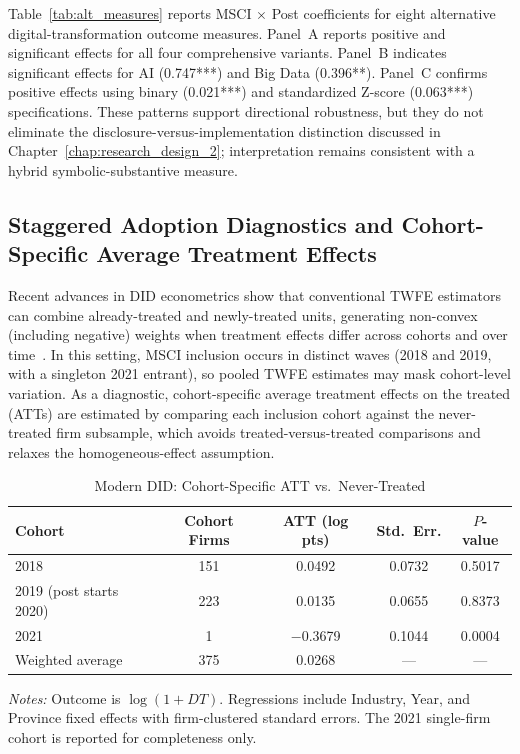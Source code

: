 Table~\ref{tab:alt_measures} reports MSCI $\times$ Post coefficients for eight alternative digital-transformation outcome measures. Panel~A reports positive and significant effects for all four comprehensive variants. Panel~B indicates significant effects for AI (0.747***) and Big Data (0.396**). Panel~C confirms positive effects using binary (0.021***) and standardized Z-score (0.063***) specifications. These patterns support directional robustness, but they do not eliminate the disclosure-versus-implementation distinction discussed in Chapter~\ref{chap:research_design_2}; interpretation remains consistent with a hybrid symbolic-substantive measure.

\subsection{Staggered Adoption Diagnostics and Cohort-Specific Average Treatment Effects}

Recent advances in DID econometrics show that conventional TWFE estimators can combine already-treated and newly-treated units, generating non-convex (including negative) weights when treatment effects differ across cohorts and over time~\cite{GoodmanBacon2021,CallawaySantAnna2021,SunAbraham2021}. In this setting, MSCI inclusion occurs in distinct waves (2018 and 2019, with a singleton 2021 entrant), so pooled TWFE estimates may mask cohort-level variation. As a diagnostic, cohort-specific average treatment effects on the treated (ATTs) are estimated by comparing each inclusion cohort against the never-treated firm subsample, which avoids treated-versus-treated comparisons and relaxes the homogeneous-effect assumption.

\begin{table}[htbp]
\centering
\caption{Modern DID: Cohort-Specific ATT vs.\ Never-Treated}
\label{tab:cohort_att}
\small
\begin{tabular}{lcccc}
\toprule
\textbf{Cohort} & \textbf{Cohort Firms} & \textbf{ATT (log pts)} & \textbf{Std.\ Err.} & \textbf{$P$-value} \\
\midrule
2018 & 151 & 0.0492 & 0.0732 & 0.5017 \\
2019 (post starts 2020) & 223 & 0.0135 & 0.0655 & 0.8373 \\
2021 & 1 & $-$0.3679 & 0.1044 & 0.0004 \\
Weighted average & 375 & 0.0268 & --- & --- \\
\bottomrule
\end{tabular}
\begin{tablenotes}
\small
\item \textit{Notes:} Outcome is $\log(1 + DT)$. Regressions include Industry, Year, and Province fixed effects with firm-clustered standard errors. The 2021 single-firm cohort is reported for completeness only.
\end{tablenotes}
\end{table}


